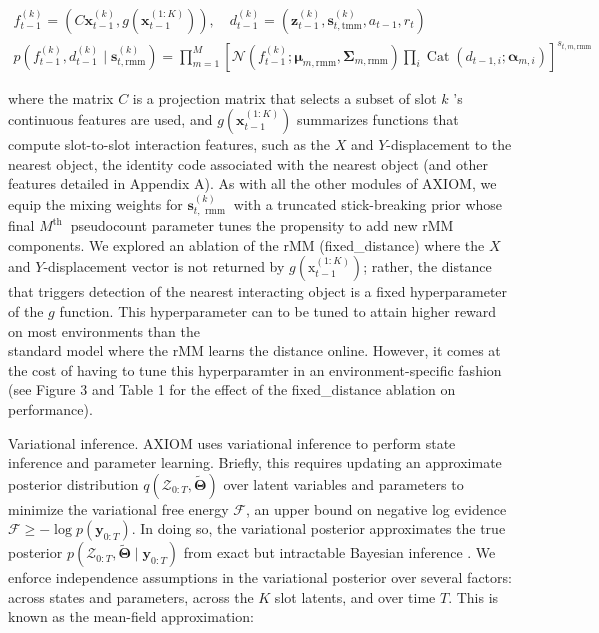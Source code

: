 \documentclass[10pt]{article}
\begin{document}
\begin{gather*}
f_{t-1}^{(k)}=\left(C \mathbf{x}_{t-1}^{(k)}, g\left(\mathbf{x}_{t-1}^{(1: K)}\right)\right), \quad d_{t-1}^{(k)}=\left(\mathbf{z}_{t-1}^{(k)}, \mathbf{s}_{t, \mathrm{tmm}}^{(k)}, a_{t-1}, r_{t}\right)  \tag{6}\\
p\left(f_{t-1}^{(k)}, d_{t-1}^{(k)} \mid \mathbf{s}_{t, \mathrm{rmm}}^{(k)}\right)=\prod_{m=1}^{M}\left[\mathcal{N}\left(f_{t-1}^{(k)} ; \boldsymbol{\mu}_{m, \mathrm{rmm}}, \boldsymbol{\Sigma}_{m, \mathrm{rmm}}\right) \prod_{i} \operatorname{Cat}\left(d_{t-1, i} ; \boldsymbol{\alpha}_{m, i}\right)\right]^{s_{t, m, \mathrm{rmm}}} \tag{7}
\end{gather*}


where the matrix $C$ is a projection matrix that selects a subset of slot $k$ 's continuous features are used, and $g\left(\mathbf{x}_{t-1}^{(1: K)}\right)$ summarizes functions that compute slot-to-slot interaction features, such as the $X$ and $Y$-displacement to the nearest object, the identity code associated with the nearest object (and other features detailed in Appendix A). As with all the other modules of AXIOM, we equip the mixing weights for $\mathbf{s}_{t, \text { rmm }}^{(k)}$ with a truncated stick-breaking prior whose final $M^{\text {th }}$ pseudocount parameter tunes the propensity to add new rMM components. We explored an ablation of the rMM (fixed\_distance) where the $X$ and $Y$-displacement vector is not returned by $g\left(\mathrm{x}_{t-1}^{(1: K)}\right)$; rather, the distance that triggers detection of the nearest interacting object is a fixed hyperparameter of the $g$ function. This hyperparameter can to be tuned to attain higher reward on most environments than the\\
standard model where the rMM learns the distance online. However, it comes at the cost of having to tune this hyperparamter in an environment-specific fashion (see Figure 3 and Table 1 for the effect of the fixed\_distance ablation on performance).

Variational inference. AXIOM uses variational inference to perform state inference and parameter learning. Briefly, this requires updating an approximate posterior distribution $q\left(\mathcal{Z}_{0: T}, \tilde{\boldsymbol{\Theta}}\right)$ over latent variables and parameters to minimize the variational free energy $\mathcal{F}$, an upper bound on negative log evidence $\mathcal{F} \geq-\log p\left(\mathbf{y}_{0: T}\right)$. In doing so, the variational posterior approximates the true posterior $p\left(\mathcal{Z}_{0: T}, \tilde{\mathbf{\Theta}} \mid \mathbf{y}_{0: T}\right)$ from exact but intractable Bayesian inference . We enforce independence assumptions in the variational posterior over several factors: across states and parameters, across the $K$ slot latents, and over time $T$. This is known as the mean-field approximation:
\end{document}
